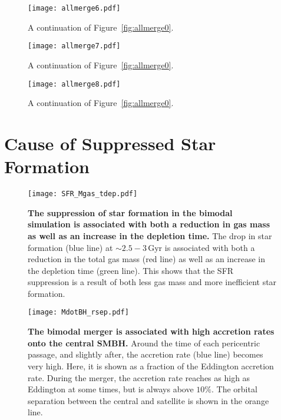 \documentclass[twocolumn,linenumbers,trackchanges]{aastex631}
\newcommand{\Gyr}{\ensuremath{\textrm{Gyr}}}
\begin{document}
\begin{figure*}
  \centering
  \texttt{[image: allmerge6.pdf]}
  \caption{A continuation of Figure~\ref{fig:allmerge0}.}
  \label{fig:allmerge6}
\end{figure*}

\begin{figure*}
  \centering
  \texttt{[image: allmerge7.pdf]}
  \caption{A continuation of Figure~\ref{fig:allmerge0}.}
  \label{fig:allmerge7}
\end{figure*}

\begin{figure*}
  \centering
  \texttt{[image: allmerge8.pdf]}
  \caption{A continuation of Figure~\ref{fig:allmerge0}.}
  \label{fig:allmerge8}
\end{figure*}

\section{Cause of Suppressed Star Formation}\label{app:cause_qui}

\begin{figure*}
  \centering
  \texttt{[image: SFR\_Mgas\_tdep.pdf]}
  \caption{\textbf{The suppression of star formation in the bimodal simulation is associated with both a reduction in gas mass as well as an increase in the depletion time.} The drop in star formation (blue line) at $\sim2.5-3\,\Gyr$ is associated with both a reduction in the total gas mass (red line) as well as an increase in the depletion time (green line). This shows that the SFR suppression is a result of both less gas mass and more inefficient star formation.}
  \label{fig:SFR_Mgas_tdep}
\end{figure*}

\begin{figure}
  \centering
  \texttt{[image: MdotBH\_rsep.pdf]}
  \caption{\textbf{The bimodal merger is associated with high accretion rates onto the central SMBH.} Around the time of each pericentric passage, and slightly after, the accretion rate (blue line) becomes very high. Here, it is shown as a fraction of the Eddington accretion rate. During the merger, the accretion rate reaches as high as Eddington at some times, but is always above $10\%$. The orbital separation between the central and satellite is shown in the orange line.}
  \label{fig:MdotBH_rsep}
\end{figure}
\end{document}
